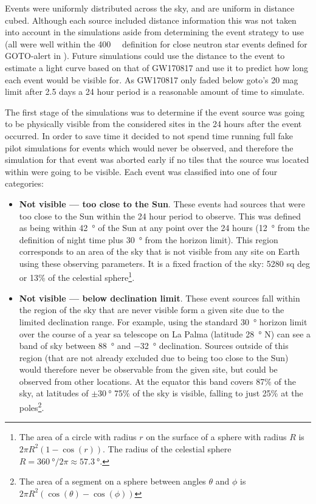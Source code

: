 \begin{colsection}
\begin{colsection}
Events were uniformly distributed across the sky, and are uniform in distance cubed. Although each source included distance information this was not taken into account in the simulations aside from determining the event strategy to use (all were well within the \SI{400}{\mega\parsec} definition for close neutron star events defined for GOTO-alert in ). Future simulations could use the distance to the event to estimate a light curve based on that of GW170817 and use it to predict how long each event would be visible for. As GW170817 only faded below \gls{goto}'s 20 mag limit after 2.5 days a 24 hour period is a reasonable amount of time to simulate.

The first stage of the simulations was to determine if the event source was going to be physically visible from the considered sites in the 24 hours after the event occurred. In order to save time it decided to not spend time running full fake pilot simulations for events which would never be observed, and therefore the simulation for that event was aborted early if no tiles that the source was located within were going to be visible. Each event was classified into one of four categories:

\begin{itemize}
    \item \textbf{Not visible --- too close to the Sun}. These events had sources that were too close to the Sun within the 24 hour period to observe. This was defined as being within \SI{42}{\degree} of the Sun at any point over the 24 hours (\SI{12}{\degree} from the definition of night time plus \SI{30}{\degree} from the horizon limit). This region corresponds to an area of the sky that is not visible from any site on Earth using these observing parameters. It is a fixed fraction of the sky: 5280 sq deg or 13\% of the celestial sphere\footnote{The area of a circle with radius $r$ on the surface of a sphere with radius $R$ is $2\pi R^2(1-\cos(r))$. The radius of the celestial sphere $R=\SI{360}{\degree}/2\pi \approx \SI{57.3}{\degree}$.}.

    \item \textbf{Not visible --- below declination limit}. These event sources fall within the region of the sky that are never visible form a given site due to the limited declination range. For example, using the standard \SI{30}{\degree} horizon limit over the course of a year sa telescope on La Palma (latitude \SI{28}{\degree} N) can see a band of sky between \SI{+88}{\degree} and \SI{-32}{\degree} declination. Sources outside of this region (that are not already excluded due to being too close to the Sun) would therefore never be observable from the given site, but could be observed from other locations. At the equator this band covers 87\% of the sky, at latitudes of $\pm \SI{30}{\degree}$ 75\% of the sky is visible, falling to just 25\% at the poles\footnote{The area of a segment on a sphere between angles $\theta$ and $\phi$ is $2 \pi R^2 (\cos(\theta)-\cos(\phi))$}.


\end{itemize}
\end{colsection}
\end{colsection}
